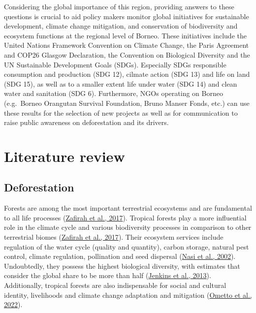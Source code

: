 \documentclass[
  letterpaper,
  DIV=11,
  numbers=noendperiod]{scrreprt}
\begin{document}
Considering the global importance of this region, providing answers to
these questions is crucial to aid policy makers monitor global
initiatives for sustainable development, climate change mitigation, and
conservation of biodiversity and ecosystem functions at the regional
level of Borneo. These initiatives include the United Nations Framework
Convention on Climate Change, the Paris Agreement and COP26 Glasgow
Declaration, the Convention on Biological Diversity and the UN
Sustainable Development Goals (SDGs). Especially SDGs responsible
consumption and production (SDG 12), cilmate action (SDG 13) and life on
land (SDG 15), as well as to a smaller extent life under water (SDG 14)
and clean water and sanitation (SDG 6). Furthermore, NGOs operating on
Borneo (e.g.~Borneo Orangutan Survival Foundation, Bruno Manser Fonds,
etc.) can use these results for the selection of new projects as well as
for communication to raise public awareness on deforestation and its
drivers.


\hypertarget{literature-review}{%
\chapter{Literature review}\label{literature-review}}

\hypertarget{sec-deforestation}{%
\section{Deforestation}\label{sec-deforestation}}

Forests are among the most important terrestrial ecosystems and are
fundamental to all life processes
(\protect\hyperlink{ref-zafirahSustainableEcosystemServices2017}{Zafirah
et al., 2017}). Tropical forests play a more influential role in the
climate cycle and various biodiversity processes in comparison to other
terrestrial biomes
(\protect\hyperlink{ref-zafirahSustainableEcosystemServices2017}{Zafirah
et al., 2017}). Their ecosystem services include regulation of the water
cycle (quality and quantity), carbon storage, natural pest control,
climate regulation, pollination and seed dispersal
(\protect\hyperlink{ref-nasiForestEcosystemServices2002}{Nasi et al.,
2002}). Undoubtedly, they possess the highest biological diversity, with
estimates that consider the global share to be more than half
(\protect\hyperlink{ref-jenkinsGlobalPatternsTerrestrial2013}{Jenkins et
al., 2013}). Additionally, tropical forests are also indispensable for
social and cultural identity, livelihoods and climate change adaptation
and mitigation
(\protect\hyperlink{ref-omettoContributionWorkingGroup2022}{Ometto et
al., 2022}).
\end{document}
